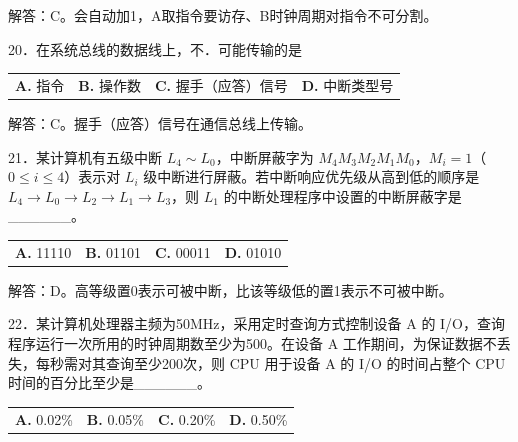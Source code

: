 \documentclass[UTF8,11pt]{ctexart}
\begin{document}
解答：C。会自动加1，A取指令要访存、B时钟周期对指令不可分割。


20．在系统总线的数据线上，不．可能传输的是


\begin{center}\begin{tabular}{>{\raggedright\arraybackslash}p{\dimexpr(\linewidth-8\tabcolsep)/4\relax}>{\raggedright\arraybackslash}p{\dimexpr(\linewidth-8\tabcolsep)/4\relax}>{\raggedright\arraybackslash}p{\dimexpr(\linewidth-8\tabcolsep)/4\relax}>{\raggedright\arraybackslash}p{\dimexpr(\linewidth-8\tabcolsep)/4\relax}}
\textbf{A.} 指令 & \textbf{B.} 操作数 & \textbf{C.} 握手（应答）信号 & \textbf{D.} 中断类型号\\[.35em]\end{tabular}\end{center}

解答：C。握手（应答）信号在通信总线上传输。


21．某计算机有五级中断 \(\displaystyle L_4\sim L_0\)，中断屏蔽字为 \(\displaystyle M_4M_3M_2M_1M_0\)，\(\displaystyle M_i=1\)（\(\displaystyle 0\le i\le4\)）表示对 \(\displaystyle L_i\) 级中断进行屏蔽。若中断响应优先级从高到低的顺序是 \(\displaystyle L_4\to L_0\to L_2\to L_1\to L_3\)，则 \(\displaystyle L_1\) 的中断处理程序中设置的中断屏蔽字是\_\_\_\_\_\_。


\begin{center}\begin{tabular}{>{\raggedright\arraybackslash}p{\dimexpr(\linewidth-8\tabcolsep)/4\relax}>{\raggedright\arraybackslash}p{\dimexpr(\linewidth-8\tabcolsep)/4\relax}>{\raggedright\arraybackslash}p{\dimexpr(\linewidth-8\tabcolsep)/4\relax}>{\raggedright\arraybackslash}p{\dimexpr(\linewidth-8\tabcolsep)/4\relax}}
\textbf{A.} 11110 & \textbf{B.} 01101 & \textbf{C.} 00011 & \textbf{D.} 01010\\[.35em]\end{tabular}\end{center}

解答：D。高等级置0表示可被中断，比该等级低的置1表示不可被中断。


22．某计算机处理器主频为50MHz，采用定时查询方式控制设备 A 的 I/O，查询程序运行一次所用的时钟周期数至少为500。在设备 A 工作期间，为保证数据不丢失，每秒需对其查询至少200次，则 CPU 用于设备 A 的 I/O 的时间占整个 CPU 时间的百分比至少是\_\_\_\_\_\_。


\begin{center}\begin{tabular}{>{\raggedright\arraybackslash}p{\dimexpr(\linewidth-8\tabcolsep)/4\relax}>{\raggedright\arraybackslash}p{\dimexpr(\linewidth-8\tabcolsep)/4\relax}>{\raggedright\arraybackslash}p{\dimexpr(\linewidth-8\tabcolsep)/4\relax}>{\raggedright\arraybackslash}p{\dimexpr(\linewidth-8\tabcolsep)/4\relax}}
\textbf{A.} 0.\allowbreak{}02\% & \textbf{B.} 0.\allowbreak{}05\% & \textbf{C.} 0.\allowbreak{}20\% & \textbf{D.} 0.\allowbreak{}50\%\\[.35em]\end{tabular}\end{center}
\end{document}
